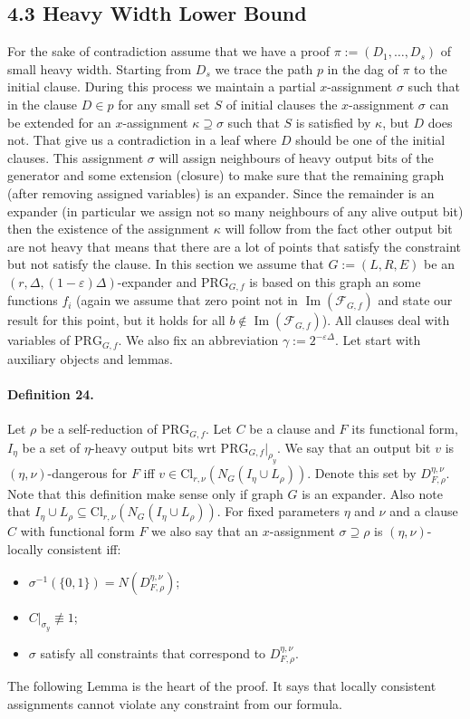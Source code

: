 \subsection*{4.3 Heavy Width Lower Bound}
For the sake of contradiction assume that we have a proof $\pi:=(D_1,\ldots,D_s)$ of small heavy width. Starting from $D_s$ we trace the path $p$ in the dag of $\pi$ to the initial clause. During this process we maintain a partial $x$-assignment $\sigma$ such that in the clause $D\in p$ for any small set $S$ of initial clauses the $x$-assignment $\sigma$ can be extended for an $x$-assignment $\kappa\supseteq\sigma$ such that $S$ is satisfied by $\kappa$, but $D$ does not. That give us a contradiction in a leaf where $D$ should be one of the initial clauses.
This assignment $\sigma$ will assign neighbours of heavy output bits of the generator and some extension (closure) to make sure that the remaining graph (after removing assigned variables) is an expander. Since the remainder is an expander (in particular we assign not so many neighbours of any alive output bit) then the existence of the assignment $\kappa$ will follow from the fact other output bit are not heavy that means that there are a lot of points that satisfy the constraint but not satisfy the clause.
In this section we assume that $G:=(L,R,E)$ be an $(r,\Delta,(1-\varepsilon)\Delta)$-expander and $\mathrm{PRG}_{G,f}$ is based on this graph an some functions $f_i$ (again we assume that zero point not in $\operatorname{Im}(\mathcal F_{G,f})$ and state our result for this point, but it holds for all $b\notin\operatorname{Im}(\mathcal F_{G,f})$). All clauses deal with variables of $\mathrm{PRG}_{G,f}$. We also fix an abbreviation $\gamma:=2^{-\varepsilon\Delta}$.
Let start with auxiliary objects and lemmas.
\paragraph{Definition 24.} Let $\rho$ be a self-reduction of $\mathrm{PRG}_{G,f}$. Let $C$ be a clause and $F$ its functional form, $I_\eta$ be a set of $\eta$-heavy output bits wrt $\mathrm{PRG}_{G,f}|_{\rho_y}$. We say that an output bit $v$ is $(\eta,\nu)$-dangerous for $F$ iff $v\in\mathrm{Cl}_{r,\nu}(N_G(I_\eta\cup L_\rho))$. Denote this set by $D_{F,\rho}^{\eta,\nu}$.
Note that this definition make sense only if graph $G$ is an expander. Also note that $I_\eta\cup L_\rho\subseteq\mathrm{Cl}_{r,\nu}(N_G(I_\eta\cup L_\rho))$. For fixed parameters $\eta$ and $\nu$ and a clause $C$ with functional form $F$ we also say that an $x$-assignment $\sigma\supseteq\rho$ is $(\eta,\nu)$-locally consistent iff:
\begin{itemize}
\item $\sigma^{-1}(\{0,1\})=N(D_{F,\rho}^{\eta,\nu})$;
\item $C|_{\sigma_y}\not\equiv1$;
\item $\sigma$ satisfy all constraints that correspond to $D_{F,\rho}^{\eta,\nu}$.
\end{itemize}
The following Lemma is the heart of the proof. It says that locally consistent assignments cannot violate any constraint from our formula.
